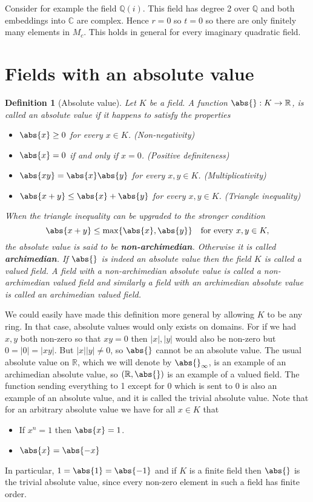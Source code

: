 \documentclass{article}
\newtheorem{definition}{Definition}[section]
\newcommand{\mbb}[1]{\mathbb{#1}}
\begin{document}
Consider for example the field $\mbb Q(i)$. This field has degree 2 over $\mbb Q$ and both embeddings into $\mbb C$ are complex. Hence $r = 0$ so $t = 0$ so there are only finitely many elements in $M_c$. This holds in general for every imaginary quadratic field.

\section{Fields with an absolute value}

\begin{definition}[Absolute value]
    Let $K$ be a field. A function $\abs{} : K \to \mbb R$, is called an absolute value if it happens to satisfy the properties
    \begin{itemize}
        \item $\abs{x} \geq 0$ for every $x \in K$. (Non-negativity)
        \item $\abs{x} = 0$ if and only if $x = 0$. (Positive definiteness)
        \item $\abs{xy} = \abs{x} \abs{y}$ for every $x,y \in K$. (Multiplicativity)
        \item $\abs{x + y} \leq \abs{x} + \abs{y}$ for every $x,y \in K$. (Triangle inequality)
    \end{itemize}
    When the triangle inequality can be upgraded to the stronger condition $$\abs{x + y} \leq \max \{\abs{x}, \abs{y}\} \quad \text{for every } x,y \in K,$$
    the absolute value is said to be \textbf{non-archimedian}. Otherwise it is called \textbf{archimedian}. If $\abs{}$ is indeed an absolute value then the field $K$ is called a valued field. A field with a non-archimedian absolute value is called a non-archimedian valued field and similarly a field with an archimedian absolute value is called an archimedian valued field.
\end{definition}
We could easily have made this definition more general by allowing $K$ to be any ring. In that case, absolute values would only exists on domains. For if we had $x,y$ both non-zero so that $xy = 0$ then $|x|, |y|$ would also be non-zero but $0 = |0| = |xy|$. But $|x||y| \neq 0$, so $\abs{}$ cannot be an absolute value. The usual absolute value on $\mbb R$, which we will denote by $\abs{}_\infty$,  is an example of an archimedian absolute value, so $(\mbb R, \abs{})$ is an example of a valued field. The function sending everything to 1 except for 0 which is sent to 0 is also an example of an absolute value, and it is called the trivial absolute value. Note that for an arbitrary absolute value we have for all $x \in K$ that
\begin{itemize}
    \item If $x^n = 1$ then $\abs{x} = 1$.
    \item $\abs{x} = \abs{-x}$
\end{itemize}
In particular, $1 = \abs{1} = \abs{-1}$ and if $K$ is a finite field then $\abs{}$ is the trivial absolute value, since every non-zero element in such a field has finite order.
\end{document}
